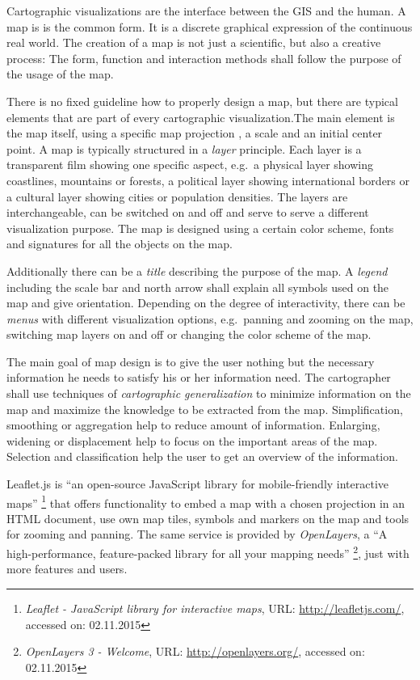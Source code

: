 Cartographic visualizations are the interface between the GIS and the human. A map is is the common form. It is a discrete graphical expression of the continuous real world. The creation of a map is not just a scientific, but also a creative process: The form, function and interaction methods shall follow the purpose of the usage of the map.

There is no fixed guideline how to properly design a map, but there are typical elements that are part of every cartographic visualization.The main element is the map itself, using a specific map projection
, a scale and an initial center point. A map is typically structured in a \emph{layer} principle. Each layer is a transparent film showing one specific aspect, e.g.\ a physical layer showing coastlines, mountains or forests, a political layer showing international borders or a cultural layer showing cities or population densities. The layers are interchangeable, can be switched on and off and serve to serve a different visualization purpose. The map is designed using a certain color scheme, fonts and signatures for all the objects on the map.

Additionally there can be a \emph{title} describing the purpose of the map. A \emph{legend} including the scale bar and north arrow shall explain all symbols used on the map and give orientation. Depending on the degree of interactivity, there can be \emph{menus} with different visualization options, e.g.\ panning and zooming on the map, switching map layers on and off or changing the color scheme of the map.
\cite[pp. 159-166]{bolstad2008gis}


The main goal of map design is to give the user nothing but the necessary information he needs to satisfy his or her information need. The cartographer shall use techniques of \emph{cartographic generalization} to minimize information on the map and maximize the knowledge to be extracted from the map. Simplification, smoothing or aggregation help to reduce amount of information. Enlarging, widening or displacement help to focus on the important areas of the map. Selection and classification help the user to get an overview of the information.
\cite{krygier2005making}

Leaflet.js is ``an open-source JavaScript library for mobile-friendly interactive maps''
\footnote{
  \textit{Leaflet - JavaScript library for interactive maps},
  URL: \url{http://leafletjs.com/},
  accessed on: 02.11.2015
}
that offers functionality to embed a map with a chosen projection in an HTML document, use own map tiles, symbols and markers on the map and tools for zooming and panning.
The same service is provided by \emph{OpenLayers}, a ``A high-performance, feature-packed library for all your mapping needs''
\footnote{
  \textit{OpenLayers 3 - Welcome},
  URL: \url{http://openlayers.org/},
  accessed on: 02.11.2015
}, just with more features and users.


